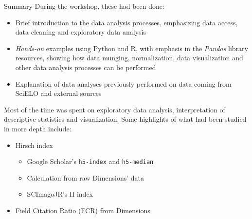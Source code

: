 \documentclass[utf8]{beamer}
\begin{document}
\begin{frame}{Summary}
  During the workshop, these had been done:

  \begin{itemize}
    \item Brief introduction to the data analysis processes,
          emphasizing data access, data cleaning
          and exploratory data analysis
    \item \emph{Hands-on} examples using Python and R,
          with emphasis in the \emph{Pandas} library resources,
          showing how data munging, normalization, data visualization
          and other data analysis processes can be performed
    \item Explanation of data analyses previously performed
          on data coming from SciELO and external sources
  \end{itemize}

  Most of the time was spent on exploratory data analysis,
  interpretation of descriptive statistics and visualization.
  Some highlights of what had been studied in more depth include:

  \begin{itemize}
    \item Hirsch index
    \begin{itemize}
      \item Google Scholar's \texttt{h5-index} and \texttt{h5-median}
      \item Calculation from raw Dimensions' data
      \item SCImagoJR's H index
    \end{itemize}
    \item Field Citation Ratio (FCR) from Dimensions
  \end{itemize}

\end{frame}
\end{document}
